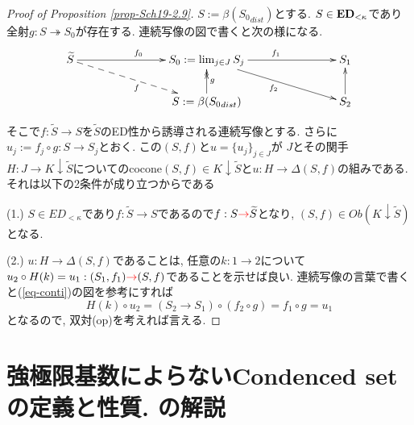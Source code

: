 \documentclass[dvipdfmx,a4paper,11pt]{article}
\theoremstyle{definition}
\newcommand{\xr}[1]{\textcolor{red}{#1}}
\begin{document}
\begin{proof}[Proof of Proposition \ref{prop-Sch19-2.9}]
$S := \beta ({S_0}_{dist})$とする. %
$S \in {\bf ED}_{< \kappa}$であり全射$g : S \twoheadrightarrow  S_0$が存在する. 
連続写像の図で書くと次の様になる. %
\begin{equation}
\label{eq-conti}
\xymatrix@C=78pt@R=20pt{
\widetilde{S} \ar@{->}[r]^{f_0}\ar@{-->}[rd]_{f} 
&S_0:= \lim_{j \in J}S_j \ar@{->}[rd]_{f_2}  \ar@{->}[r]^{f_1} 
& S_1 
\\
&S := \beta ({S_0}_{dist}) \ar@{->>}[u]_{g} 
&
S_2\ar@{->}[u] 
}
\end{equation}


そこで$f : \widetilde{S} \to S $を$\widetilde{S}$のED性から誘導される連続写像とする. 
さらに$u_j := f_j \circ g: S \to S_j$とおく. この$(S, f)$と$u=\{ u_j \}_{j \in J}$が
$J$とその関手$H : J \to K \downarrow \widetilde{S}$についてのcocone$(S,f) \in K \downarrow \widetilde{S}$と$u : H \to \Delta (S,f)$の組みである. 
それは以下の2条件が成り立つからである

(1.) $S \in ED_{<\kappa}$であり$f : \widetilde{S} \to S $であるので$f : S \xr{\to} \widetilde{S}$となり, $(S, f) \in Ob(K \downarrow \widetilde{S})$となる. 

(2.) $u : H \to \Delta (S,f)$であることは, 任意の$k : 1 \to 2$について
$u_{2} \circ H(k)  = u_{1} : (S_1,f_1) \xr{\to} (S,f)$であることを示せば良い.
連続写像の言葉で書くと(\ref{eq-conti})の図を参考にすれば
$$
H(k) \circ u_2
=
(S_2 \to S_1) \circ (f_2 \circ g)
=
f_1 \circ g 
=
u_1
$$
となるので, 双対(op)を考えれば言える.
\end{proof}

\section{強極限基数によらないCondenced setの定義と性質. \cite[Definition 2.11]{Sch19}の解説}
\end{document}
